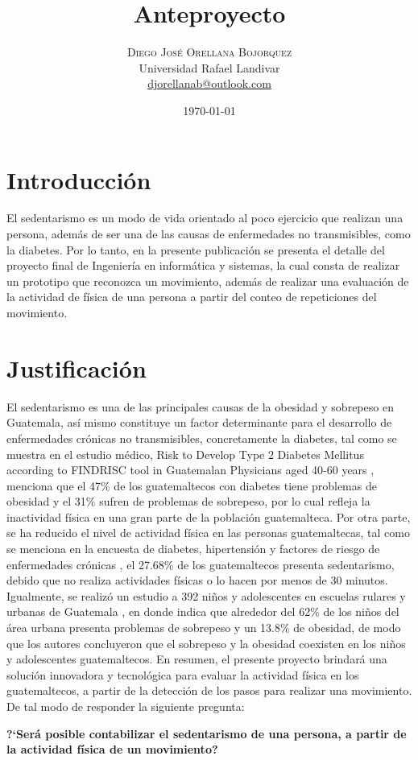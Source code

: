 \documentclass[twoside,twocolumn]{article}
\title{Anteproyecto} %
\author{%
\textsc{Diego José Orellana Bojorquez} \\[1ex] %
\normalsize Universidad Rafael Landivar \\ %
\normalsize \href{mailto:djorellanab@outlook.com}{djorellanab@outlook.com} %
}
\date{\today} %
\begin{document}
\maketitle


\section{Introducción}

El sedentarismo es un modo de vida orientado al poco ejercicio que realizan una persona, además de ser una de las causas de enfermedades no transmisibles, como la diabetes. Por lo tanto, en la presente publicación se presenta el detalle del proyecto final de Ingeniería en informática y sistemas, la cual consta de realizar un prototipo que reconozca un movimiento, además de realizar una evaluación de la actividad de física de una persona a partir del conteo de repeticiones del movimiento.

\section{Justificación}
El sedentarismo es una de las principales causas de la obesidad y sobrepeso en Guatemala, as\'i mismo constituye un factor determinante para el desarrollo de enfermedades cr\'onicas no transmisibles, concretamente la diabetes, tal como se muestra en el estudio m\'edico, Risk to Develop Type 2 Diabetes Mellitus according to FINDRISC tool in Guatemalan Physicians aged 40-60 years \cite{castro2017risk}, menciona que el 47\% de los guatemaltecos con diabetes tiene problemas de obesidad y el 31\%  sufren de problemas de sobrepeso, por lo cual refleja la inactividad f\'isica en una gran parte de la poblaci\'on guatemalteca.
\medbreak
Por otra parte, se ha reducido el nivel de actividad f\'isica en las personas guatemaltecas, tal como se menciona en la encuesta de diabetes, hipertensi\'on y factores de riesgo de enfermedades cr\'onicas \cite{orellana2006organizacion}, el 27.68\% de los guatemaltecos presenta sedentarismo, debido que no realiza actividades f\'isicas o lo hacen por menos de 30 minutos.
\medbreak
Igualmente, se realiz\'o un estudio a 392 ni\~nos y adolescentes en escuelas rulares y urbanas de Guatemala \cite{orellana2006organizacion}, en donde indica que alrededor del 62\% de los ni\~nos del  \'area urbana presenta problemas de sobrepeso y un 13.8\% de obesidad, de modo que los autores concluyeron que el sobrepeso y la obesidad coexisten en los ni\~nos y adolescentes guatemaltecos.
\medbreak
En resumen, el presente proyecto brindar\'a una soluci\'on innovadora y tecnol\'ogica para evaluar la actividad f\'isica en los guatemaltecos, a partir de la detecci\'on de los pasos para realizar una movimiento. De tal modo de responder la siguiente pregunta:
\medbreak
\begin{center}
\textbf{?`Será posible contabilizar el sedentarismo de una persona, a partir de la actividad física de un movimiento?}
\end{center}
\end{document}
